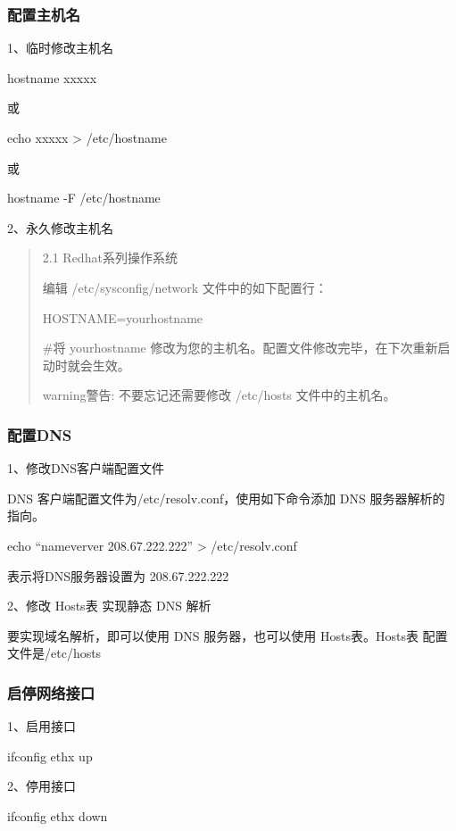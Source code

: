 \documentclass[letterpaper,10pt]{sphinxmanual}
\begin{document}
\subsubsection{配置主机名}
\label{Linux_net/ip:id2}
1、临时修改主机名

hostname xxxxx

或

echo xxxxx \textgreater{} /etc/hostname

或

hostname -F /etc/hostname

2、永久修改主机名
\begin{quote}

2.1 Redhat系列操作系统

编辑 /etc/sysconfig/network 文件中的如下配置行：

HOSTNAME=yourhostname

\#将 yourhostname 修改为您的主机名。配置文件修改完毕，在下次重新启动时就会生效。

\begin{notice}{warning}{警告:}
不要忘记还需要修改 /etc/hosts 文件中的主机名。
\end{notice}
\end{quote}


\subsubsection{配置DNS}
\label{Linux_net/ip:dns}
1、修改DNS客户端配置文件

DNS 客户端配置文件为/etc/resolv.conf，使用如下命令添加 DNS 服务器解析的指向。

echo ``nameverver 208.67.222.222'' \textgreater{} /etc/resolv.conf

表示将DNS服务器设置为 208.67.222.222

2、修改 Hosts表 实现静态 DNS 解析

要实现域名解析，即可以使用 DNS 服务器，也可以使用 Hosts表。Hosts表 配置文件是/etc/hosts


\subsubsection{启停网络接口}
\label{Linux_net/ip:id3}
1、启用接口

ifconfig ethx up

2、停用接口

ifconfig  ethx down
\end{document}

